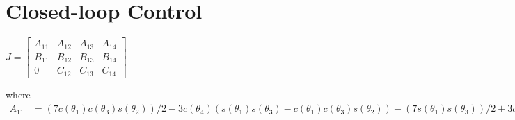 \documentclass[11pt]{article}
\begin{document}
\section{Closed-loop Control}
\begin{center}
$
\begin{equation}
J
= 
\begin{bmatrix}
A_{11} & A_{12} & A_{13} & A_{14} \\
B_{11} & B_{12} & B_{13} & B_{14} \\
     0 & C_{12} & C_{13} & C_{14}
\end{bmatrix}
\end{equation}
$ 
\end{center}
where
$
\begin{align*}
A_{11} &= (7c(\theta_1)c(\theta_3) s(\theta_2))/2 - 3 c(\theta_4) (s(\theta_1) s(\theta_3) - c(\theta_1) c(\theta_3) s(\theta_2)) - (7 s(\theta_1) s(\theta_3))/2 + 3 c(\theta_1) c(\theta_2) s(\theta_4)

A_{12} &= (7 c(\theta_2) c(\theta_3) s(\theta_1))/2 - 3 s(\theta_1) s(\theta_2) s(\theta_4) + 3 c(\theta_2) c(\theta_3) c(\theta_4) s(\theta_1)

A_{13} &= (7 c(\theta_1) c(\theta_3))/2 + 3 c(\theta_4) (c(\theta_1) c(\theta_3) - s(\theta_1) s(\theta_2) s(\theta_3)) - (7 s(\theta_1) s(\theta_2) s(\theta_3))/2

A_{14} &= 3 c(\theta_2) c(\theta_4) s(\theta_1) - 3 s(\theta_4) (c(\theta_1) s(\theta_3) + c(\theta_3) s(\theta_1) s(\theta_2))

B_{11} &= (7 c(\theta_1) s(\theta_3))/2 + 3 c(\theta_4) (c(\theta_1) s(\theta_3) + c(\theta_3) s(\theta_1) s(\theta_2)) + (7 c(\theta_3) s(\theta_1) s(\theta_2))/2 + 3 c(\theta_2) s(\theta_1) s(\theta_4)

B_{12} &= 3 c(\theta_1) s(\theta_2) s(\theta_4) - (7 c(\theta_1) c(\theta_2) c(\theta_3))/2 - 3 c(\theta_1) c(\theta_2) c(\theta_3) c(\theta_4)

B_{13} &= (7 c(\theta_3) s(\theta_1))/2 + 3 c(\theta_4) (c(\theta_3) s(\theta_1) + c(\theta_1) s(\theta_2) s(\theta_3)) + (7 c(\theta_1) s(\theta_2) s(\theta_3))/2

B_{14} &= - 3 s(\theta_4) (s(\theta_1) s(\theta_3) - c(\theta_1) c(\theta_3) s(\theta_2)) - 3 c(\theta_1) c(\theta_2) c(\theta_4)

C_{12} &= - (7 c(\theta_3) s(\theta_2))/2 - 3 c(\theta_2) s(\theta_4) - 3 c(\theta_3) c(\theta_4) s(\theta_2)

C_{13} &= - (7 c(\theta_2) s(\theta_3))/2 - 3 c(\theta_2) c(\theta_4) s(\theta_3)

C_{14} &= - 3 c(\theta_4) s(\theta_2) - 3 c(\theta_2) c(\theta_3) s(\theta_4)
\end{align*}
$
\end{document}
